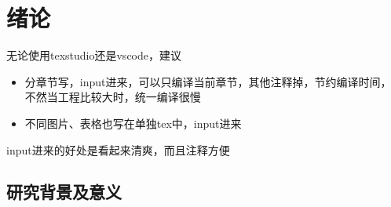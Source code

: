 \chapter{绪论}

无论使用texstudio还是vscode，建议
\begin{itemize}
	\item 分章节写，input进来，可以只编译当前章节，其他注释掉，节约编译时间，不然当工程比较大时，统一编译很慢
	\item 不同图片、表格也写在单独tex中，input进来
\end{itemize}

input进来的好处是看起来清爽，而且注释方便

\section{研究背景及意义}




